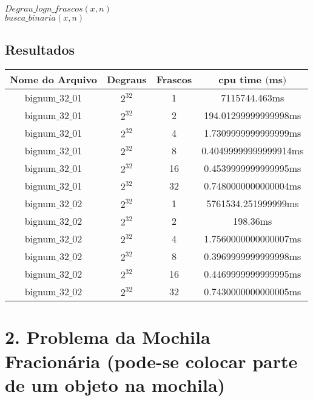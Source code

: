 \documentclass[10pt,a4paper]{article}
\begin{document}
$Degrau\_logn\_frascos(x,n)$\\
					

	\hspace{1cm}$busca\_binaria(x,n)$
	
	

	\subsection*{Resultados}

	\vspace{0.5cm}	
	
	\begin{center}
		\begin{tabular}{|c|c|c|c|}
			\hline
			Nome do Arquivo & Degraus & Frascos & cpu time $($ms$)$ \\
			\hline
			bignum$\_$32$\_$01 & $2^{32}$ & 1 & 7115744.463ms \\
			\hline
			bignum$\_$32$\_$01 & $2^{32}$ & 2 & 194.01299999999998ms \\
			\hline
			bignum$\_$32$\_$01 & $2^{32}$ & 4 & 1.7309999999999999ms \\
			\hline
			bignum$\_$32$\_$01 & $2^{32}$ & 8 & 0.40499999999999914ms \\
			\hline
			bignum$\_$32$\_$01 & $2^{32}$ & 16 & 0.4539999999999995ms \\
			\hline
			bignum$\_$32$\_$01 & $2^{32}$ & 32 & 0.7480000000000004ms \\
			\hline
			bignum$\_$32$\_$02 & $2^{32}$ & 1 & 5761534.251999999ms \\
			\hline
			bignum$\_$32$\_$02 & $2^{32}$ & 2 & 198.36ms \\
			\hline
			bignum$\_$32$\_$02 & $2^{32}$ & 4 & 1.7560000000000007ms \\
			\hline
			bignum$\_$32$\_$02 & $2^{32}$ & 8 & 0.3969999999999998ms \\
			\hline
			bignum$\_$32$\_$02 & $2^{32}$ & 16 & 0.4469999999999995ms \\
			\hline
			bignum$\_$32$\_$02 & $2^{32}$ & 32 & 0.7430000000000005ms \\
			\hline
			
		\end{tabular}
	\end{center}
	
	
	
	\section*{2. Problema da Mochila Fracionária (pode-se colocar parte de um objeto na mochila)}
	
\end{document}
